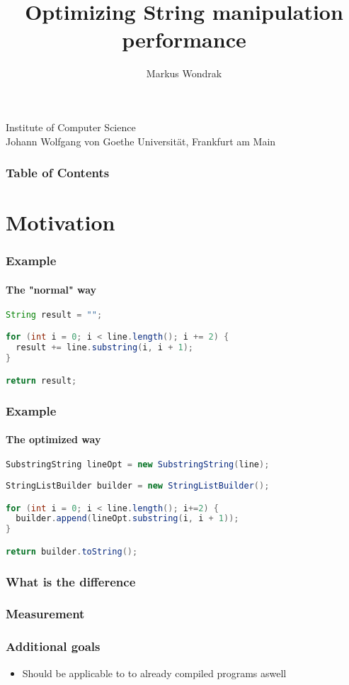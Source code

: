 \documentclass{beamer}
\begin{document}
\title[Optimization]
{Optimizing String manipulation performance}
\author{Markus Wondrak}
\institute
{
  Institute of Computer Science\\
  Johann Wolfgang von Goethe Universität, Frankfurt am Main
}

\frame{\titlepage}

\begin{frame}
  \frametitle{Table of Contents}
  \tableofcontents
\end{frame}

\section{Motivation}  

\begin{frame}[fragile]

  \frametitle{Example}
  \framesubtitle{The "normal" way}

  \begin{lstlisting}[language=Java]
String result = "";

for (int i = 0; i < line.length(); i += 2) {
  result += line.substring(i, i + 1);
}

return result;
  \end{lstlisting}%
\end{frame}


\begin{frame}[fragile]
  \frametitle{Example}
  \framesubtitle{The optimized way}
  \begin{lstlisting}[language=Java]
SubstringString lineOpt = new SubstringString(line);
  
StringListBuilder builder = new StringListBuilder();

for (int i = 0; i < line.length(); i+=2) {
  builder.append(lineOpt.substring(i, i + 1));
}

return builder.toString();
  \end{lstlisting}%
\end{frame}

\begin{frame}

   \frametitle{What is the difference}

\end{frame}

\begin{frame}
  \frametitle{Measurement}

\end{frame}

\begin{frame}
  \frametitle{Additional goals}
  \begin{itemize}
    \item Should be applicable to to already compiled programs aswell
  
  \end{itemize}
\end{frame}
\end{document}
